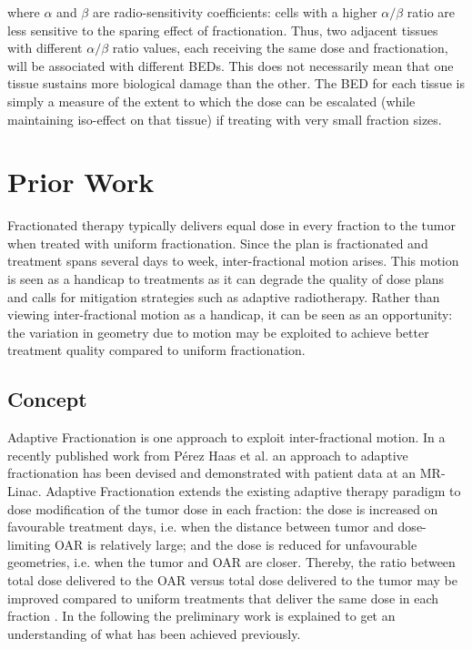 \documentclass[\relativeRoot/ada.tex]{subfiles}
\begin{document}
where $\alpha$ and $\beta$ are radio-sensitivity coefficients: cells with a higher $\alpha / \beta$ ratio are less sensitive to the sparing effect of fractionation. Thus, two adjacent tissues with different $\alpha / \beta$ ratio values, each receiving the same dose and fractionation, will be associated with different BEDs. This does not necessarily mean that one tissue sustains more biological damage than the other. The BED for each tissue is simply a measure of the extent to which the dose can be escalated (while maintaining iso-effect on that tissue) if treating with very small fraction sizes. \cite{jones_bedrole}

\section{Prior Work}

Fractionated therapy typically delivers equal dose in every fraction to the tumor when treated with uniform fractionation. Since the plan is fractionated and treatment spans several days to week, inter-fractional motion arises. This motion is seen as a handicap to treatments as it can degrade the quality of dose plans and calls for mitigation strategies such as adaptive radiotherapy. Rather than viewing inter-fractional motion as a handicap, it can be seen as an opportunity: the variation in geometry due to motion may be exploited to achieve better treatment quality compared to uniform fractionation.

\subsection{Concept}
Adaptive Fractionation \cite{lu_adaptI}\cite{chen_adaptII}\cite{ramakrishnan_adaptIII} is one approach to exploit inter-fractional motion. In a recently published work from Pérez Haas et al. \cite{perezhaas_adaptive} an approach to adaptive fractionation has been devised and demonstrated with patient data at an MR-Linac.
Adaptive Fractionation extends the existing adaptive therapy paradigm to dose modification of the tumor dose in each fraction: the dose is increased on favourable treatment days, i.e. when the distance between tumor and dose-limiting OAR is relatively large; and the dose is reduced for unfavourable geometries, i.e. when the tumor and OAR are closer. Thereby, the ratio between total dose delivered to the OAR versus total dose delivered to the tumor may be improved compared to uniform treatments that deliver the same dose in each fraction \cite{perezhaas_adaptive}. In the following the preliminary work is explained to get an understanding of what has been achieved previously.
\end{document}
